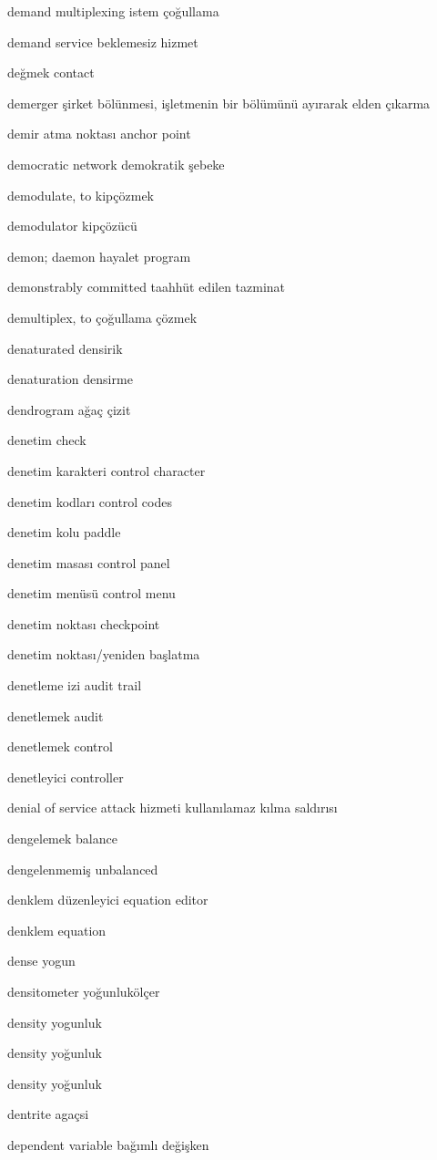 \documentclass[12pt,fleqn]{article}\usepackage{../../common}
\begin{document}
demand multiplexing istem çoğullama

demand service beklemesiz hizmet

değmek contact

demerger şirket bölünmesi, işletmenin bir bölümünü ayırarak elden çıkarma

demir atma noktası anchor point

democratic network demokratik şebeke

demodulate, to kipçözmek

demodulator kipçözücü

demon; daemon hayalet program

demonstrably committed taahhüt edilen tazminat

demultiplex, to çoğullama çözmek

denaturated densirik

denaturation densirme

dendrogram ağaç çizit

denetim check

denetim karakteri control character

denetim kodları control codes

denetim kolu paddle

denetim masası control panel

denetim menüsü control menu

denetim noktası checkpoint

denetim noktası/yeniden başlatma

denetleme izi audit trail

denetlemek audit

denetlemek control

denetleyici controller

denial of service attack hizmeti kullanılamaz kılma saldırısı

dengelemek balance

dengelenmemiş unbalanced

denklem düzenleyici equation editor

denklem equation

dense yogun

densitometer yoğunlukölçer

density yogunluk

density yoğunluk

density yoğunluk

dentrite agaçsi

dependent variable bağımlı değişken
\end{document}
